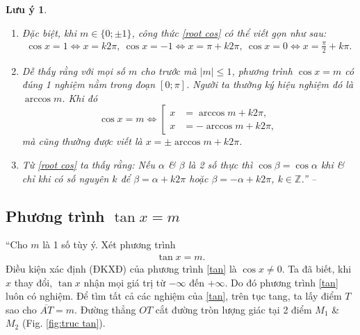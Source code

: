 \documentclass[oneside]{book}
\numberwithin{equation}{section}
\newtheorem{luuy}{Lưu ý}[section]
\begin{document}
\begin{luuy}
	\begin{enumerate}
		\item Đặc biệt, khi $m\in\{0;\pm 1\}$, công thức \eqref{root cos} có thể viết gọn như sau:
		\begin{align*}
			\cos x = 1\Leftrightarrow x = k2\pi,\ \cos x = -1\Leftrightarrow x = \pi + k2\pi,\ \cos x = 0\Leftrightarrow x = \frac{\pi}{2} + k\pi.
		\end{align*}
		\item Dễ thấy rằng với mọi số $m$ cho trước mà $|m|\le 1$, phương trình $\cos x = m$ có đúng 1 nghiệm nằm trong đoạn $[0;\pi]$. Người ta thường ký hiệu nghiệm đó là $\arccos m$. Khi đó
		\begin{equation*}
			\cos x = m\Leftrightarrow\left[\begin{split}
				x &= \arccos m + k2\pi,\\
				x &= -\arccos m + k2\pi,
			\end{split}\right.
		\end{equation*}
		mà cũng thường được viết là $x = \pm\arccos m + k2\pi$.
		\item Từ \eqref{root cos} ta thấy rằng: Nếu $\alpha$ \& $\beta$ là 2 số thực thì $\cos\beta = \cos\alpha$ khi \& chỉ khi có số nguyên $k$ để $\beta = \alpha + k2\pi$ hoặc $\beta = -\alpha + k2\pi$, $k\in\mathbb{Z}$.'' -- \cite[pp. 23--24]{SGK_Toan_11_dai_so_giai_tich_nang_cao}
	\end{enumerate}
\end{luuy}

\subsection{Phương trình $\tan x = m$}
``Cho $m$ là 1 số tùy ý. Xét phương trình
\begin{align}
	\label{tan}
	\tag{tan}
	\tan x = m.
\end{align}
Điều kiện xác định (ĐKXĐ) của phương trình \eqref{tan} là $\cos x\ne 0$. Ta đã biết, khi $x$ thay đổi, $\tan x$ nhận mọi giá trị từ $-\infty$ đến $+\infty$. Do đó phương trình \eqref{tan} luôn có nghiệm. Để tìm tất cả các nghiệm của \eqref{tan}, trên tục tang, ta lấy điểm $T$ sao cho $\overline{AT} = m$. Đường thẳng $OT$ cắt đường tròn lượng giác tại 2 điểm $M_1$ \& $M_2$ (Fig. \ref{fig:truc tan}).
\end{document}
